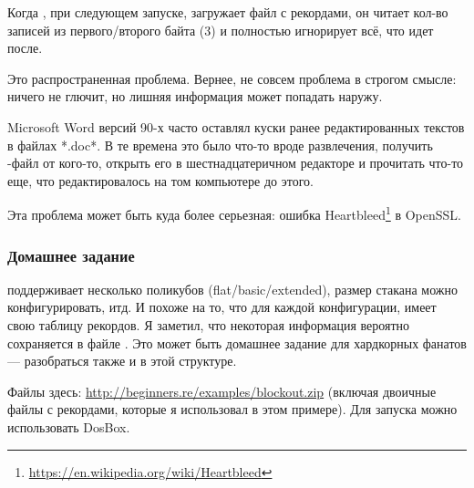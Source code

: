 Когда , при следующем запуске, загружает файл с рекордами, он читает кол-во записей из первого/второго байта (3)
и полностью игнорирует всё, что идет после.

Это распространенная проблема.
Вернее, не совсем проблема в строгом смысле: ничего не глючит, но лишняя информация может попадать наружу.

Microsoft Word версий 90-х часто оставлял куски ранее редактированных текстов в файлах *.doc*.
В те времена это было что-то вроде развлечения, получить -файл от кого-то, открыть его в шестнадцатеричном редакторе
и прочитать что-то еще, что редактировалось на том компьютере до этого.

Эта проблема может быть куда более серьезная: ошибка Heartbleed\footnote{\url{https://en.wikipedia.org/wiki/Heartbleed}}
в OpenSSL.

\subsubsection{Домашнее задание}

 поддерживает несколько поликубов (flat/basic/extended), размер стакана можно конфигурировать, итд.
И похоже на то, что для каждой конфигурации,  имеет свою таблицу рекордов.
Я заметил, что некоторая информация вероятно сохраняется в файле .
Это может быть домашнее задание для хардкорных фанатов  --- разобраться также и в этой структуре.

Файлы  здесь: \url{http://beginners.re/examples/blockout.zip}
(включая двоичные файлы с рекордами, которые я использовал в этом примере).
Для запуска можно использовать DosBox.

